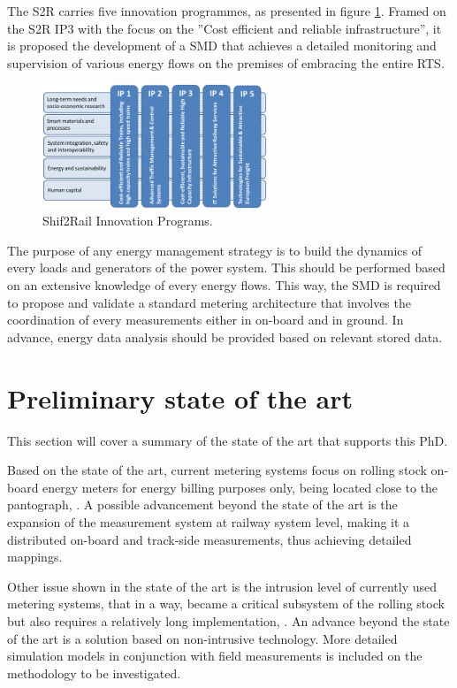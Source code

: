 The \ac{S2R} carries five innovation programmes, as presented in figure \ref{fig:ips}. Framed on the S2R \ac{IP3} with the focus on the ”Cost efficient and reliable infrastructure”, it is proposed the development of a \ac{SMD} that achieves a detailed monitoring and supervision of various energy flows on the premises of embracing the entire \ac{RTS}.

\begin{figure}[h!]
	\centering
	\includegraphics[width=0.60\textwidth,keepaspectratio]{figures/1.Intro/IPs}
	\caption{Shif2Rail Innovation Programs. }
	\label{fig:ips}
\end{figure}

The purpose of any energy management strategy is to build the dynamics of every loads and generators of the power system. 
This should be performed based on an extensive knowledge of every energy flows. 
This way, the \ac{SMD} is required to propose and validate a standard metering architecture that involves the coordination of every measurements either in on-board and in ground. 
In advance, energy data analysis should be provided based on relevant stored data. 

\section{Preliminary state of the art}

This section will cover a summary of the state of the art that supports this PhD.

Based on the state of the art, current metering systems focus on rolling stock on-board energy meters for energy billing purposes only, being located close to the pantograph, \cite{shift2rail2015}.
A possible advancement beyond the state of the art is the expansion of the measurement system at railway system level, making it a distributed on-board and track-side measurements, thus achieving detailed mappings. 


Other issue shown in the state of the art is the intrusion level of currently used metering systems, that in a way, became a critical subsystem of the rolling stock but also requires a relatively long implementation, \cite{shift2rail2015}. 
An advance beyond the state of the art is a solution based on non-intrusive technology. More detailed simulation models in conjunction with field measurements is included on the methodology to be investigated.



